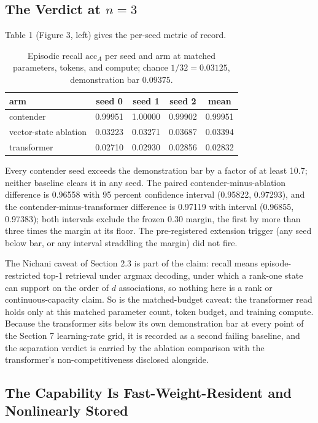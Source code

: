 \subsection{The Verdict at $n{=}3$}

Table 1 (Figure 3, left) gives the per-seed metric of record.

\begin{table}[t]
\centering
\caption{Episodic recall $\mathrm{acc}_A$ per seed and arm at matched parameters, tokens, and compute; chance $1/32=0.03125$, demonstration bar $0.09375$.}
\label{tab:recall}
\begin{tabular}{lcccc}
\toprule
arm & seed 0 & seed 1 & seed 2 & mean \\
\midrule
contender & 0.99951 & 1.00000 & 0.99902 & 0.99951 \\
vector-state ablation & 0.03223 & 0.03271 & 0.03687 & 0.03394 \\
transformer & 0.02710 & 0.02930 & 0.02856 & 0.02832 \\
\bottomrule
\end{tabular}
\end{table}

Every contender seed exceeds the demonstration bar by a factor of at
least 10.7; neither baseline clears it in any seed. The paired contender-minus-ablation difference is
0.96558 with 95 percent confidence interval (0.95822, 0.97293), and the
contender-minus-transformer difference is 0.97119 with interval
(0.96855, 0.97383); both intervals exclude the frozen 0.30 margin, the
first by more than three times the margin at its floor. The pre-registered extension trigger (any seed
below bar, or any interval straddling the margin) did not fire.

The Nichani caveat of Section 2.3 is part of the claim: recall means
episode-restricted top-1 retrieval under argmax decoding, under which a
rank-one state can support on the order of $d$ associations, so nothing
here is a rank or continuous-capacity claim. So is the matched-budget
caveat: the transformer read holds only at this matched parameter
count, token budget, and training compute. Because the transformer sits below its own demonstration bar
at every point of the Section 7 learning-rate grid, it is recorded as
a second failing baseline, and the separation
verdict is carried by the ablation comparison with the transformer's
non-competitiveness disclosed alongside.

\subsection{The Capability Is Fast-Weight-Resident and Nonlinearly Stored}

